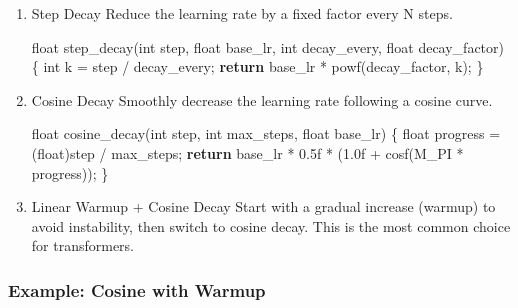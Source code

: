 \documentclass[
  letterpaper,
  DIV=11,
  numbers=noendperiod]{scrreprt}
\newenvironment{Shaded}{\begin{snugshade}}{\end{snugshade}}
\newcommand{\BuiltInTok}[1]{\textcolor[rgb]{0.00,0.23,0.31}{#1}}
\newcommand{\ControlFlowTok}[1]{\textcolor[rgb]{0.00,0.23,0.31}{\textbf{#1}}}
\newcommand{\DataTypeTok}[1]{\textcolor[rgb]{0.68,0.00,0.00}{#1}}
\newcommand{\FloatTok}[1]{\textcolor[rgb]{0.68,0.00,0.00}{#1}}
\newcommand{\NormalTok}[1]{\textcolor[rgb]{0.00,0.23,0.31}{#1}}
\newcommand{\OperatorTok}[1]{\textcolor[rgb]{0.37,0.37,0.37}{#1}}
\begin{document}
\begin{enumerate}
\def\labelenumi{\arabic{enumi}.}
\item
  Step Decay Reduce the learning rate by a fixed factor every N steps.

\begin{Shaded}
\begin{Highlighting}[]
\DataTypeTok{float}\NormalTok{ step\_decay}\OperatorTok{(}\DataTypeTok{int}\NormalTok{ step}\OperatorTok{,} \DataTypeTok{float}\NormalTok{ base\_lr}\OperatorTok{,} \DataTypeTok{int}\NormalTok{ decay\_every}\OperatorTok{,} \DataTypeTok{float}\NormalTok{ decay\_factor}\OperatorTok{)} \OperatorTok{\{}
    \DataTypeTok{int}\NormalTok{ k }\OperatorTok{=}\NormalTok{ step }\OperatorTok{/}\NormalTok{ decay\_every}\OperatorTok{;}
    \ControlFlowTok{return}\NormalTok{ base\_lr }\OperatorTok{*}\NormalTok{ powf}\OperatorTok{(}\NormalTok{decay\_factor}\OperatorTok{,}\NormalTok{ k}\OperatorTok{);}
\OperatorTok{\}}
\end{Highlighting}
\end{Shaded}
\item
  Cosine Decay Smoothly decrease the learning rate following a cosine
  curve.

\begin{Shaded}
\begin{Highlighting}[]
\DataTypeTok{float}\NormalTok{ cosine\_decay}\OperatorTok{(}\DataTypeTok{int}\NormalTok{ step}\OperatorTok{,} \DataTypeTok{int}\NormalTok{ max\_steps}\OperatorTok{,} \DataTypeTok{float}\NormalTok{ base\_lr}\OperatorTok{)} \OperatorTok{\{}
    \DataTypeTok{float}\NormalTok{ progress }\OperatorTok{=} \OperatorTok{(}\DataTypeTok{float}\OperatorTok{)}\NormalTok{step }\OperatorTok{/}\NormalTok{ max\_steps}\OperatorTok{;}
    \ControlFlowTok{return}\NormalTok{ base\_lr }\OperatorTok{*} \FloatTok{0.5}\BuiltInTok{f} \OperatorTok{*} \OperatorTok{(}\FloatTok{1.0}\BuiltInTok{f} \OperatorTok{+}\NormalTok{ cosf}\OperatorTok{(}\NormalTok{M\_PI }\OperatorTok{*}\NormalTok{ progress}\OperatorTok{));}
\OperatorTok{\}}
\end{Highlighting}
\end{Shaded}
\item
  Linear Warmup + Cosine Decay Start with a gradual increase (warmup) to
  avoid instability, then switch to cosine decay. This is the most
  common choice for transformers.
\end{enumerate}

\subsubsection{Example: Cosine with
Warmup}\label{example-cosine-with-warmup}
\end{document}

